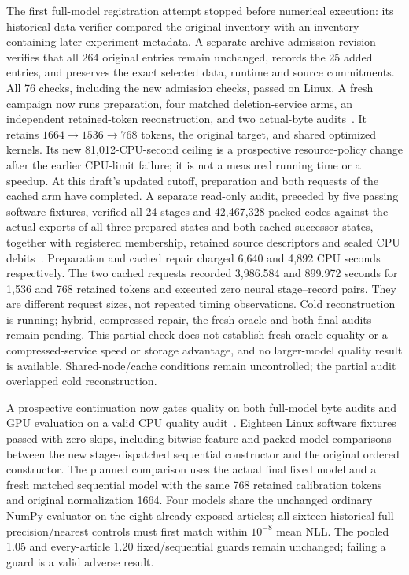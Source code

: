 \documentclass[10pt,twocolumn,letterpaper]{article}
\begin{document}
The first full-model registration attempt stopped before numerical execution:
its historical data verifier compared the original inventory with an inventory
containing later experiment metadata. A separate archive-admission revision
verifies that all 264 original entries remain unchanged, records the 25 added
entries, and preserves the exact selected data, runtime and source commitments.
All 76 checks, including the new admission checks, passed on Linux. A fresh
campaign now runs preparation, four matched deletion-service arms, an independent
retained-token reconstruction, and two actual-byte audits~\cite{v54}. It retains
$1664\to1536\to768$ tokens, the original target, and shared optimized kernels.
Its new 81,012-CPU-second ceiling is a prospective resource-policy change after
the earlier CPU-limit failure; it is not a measured running time or a speedup.
At this draft's updated cutoff, preparation and both requests of the cached
arm have completed. A separate read-only audit, preceded by five passing
software fixtures, verified all 24 stages and 42,467,328 packed codes against
the actual exports of all three prepared states and both cached successor
states, together with registered membership, retained source descriptors and
sealed CPU debits~\cite{v57prefix}. Preparation and cached repair charged 6,640
and 4,892 CPU seconds respectively. The two cached requests recorded
3,986.584 and 899.972 seconds for 1,536 and 768 retained tokens and executed
zero neural stage--record pairs. They are different request sizes, not repeated
timing observations. Cold reconstruction is running; hybrid, compressed repair,
the fresh oracle and both final audits remain pending. This partial check does
not establish fresh-oracle equality or a compressed-service speed or storage
advantage, and no larger-model quality result is available. Shared-node/cache
conditions remain uncontrolled; the partial audit overlapped cold reconstruction.


A prospective continuation now gates quality on both full-model byte audits
and GPU evaluation on a valid CPU quality audit~\cite{v56plan}. Eighteen Linux
software fixtures passed with zero skips, including bitwise feature and packed
model comparisons between the new stage-dispatched sequential constructor and
the original ordered constructor. The planned comparison uses the actual final
fixed model and a fresh matched sequential model with the same 768 retained
calibration tokens and original normalization 1664. Four models share the
unchanged ordinary NumPy evaluator on the eight already exposed articles;
all sixteen historical full-precision/nearest controls must first match within
$10^{-8}$ mean NLL. The pooled 1.05 and every-article 1.20 fixed/sequential
guards remain unchanged; failing a guard is a valid adverse result.
\end{document}
